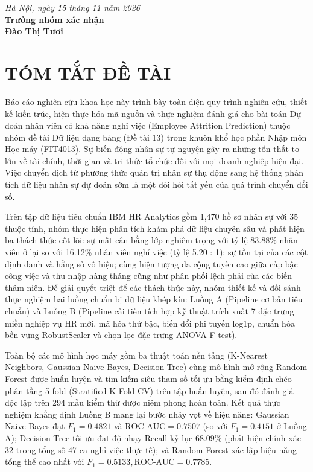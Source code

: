 \documentclass[12pt,a4paper]{article}
\begin{document}
\vspace{0.8cm}
\begin{flushright}
\textit{Hà Nội, ngày 15 tháng 11 năm 2026}\\[0.2cm]
\textbf{Trưởng nhóm xác nhận}\\[1.5cm]
\textbf{Đào Thị Tươi}
\end{flushright}

\newpage
\section*{TÓM TẮT ĐỀ TÀI}

Báo cáo nghiên cứu khoa học này trình bày toàn diện quy trình nghiên cứu, thiết kế kiến trúc, hiện thực hóa mã nguồn và thực nghiệm đánh giá cho bài toán Dự đoán nhân viên có khả năng nghỉ việc (Employee Attrition Prediction) thuộc nhóm đề tài Dữ liệu dạng bảng (Đề tài 13) trong khuôn khổ học phần Nhập môn Học máy (FIT4013). Sự biến động nhân sự tự nguyện gây ra những tổn thất to lớn về tài chính, thời gian và tri thức tổ chức đối với mọi doanh nghiệp hiện đại. Việc chuyển dịch từ phương thức quản trị nhân sự thụ động sang hệ thống phân tích dữ liệu nhân sự dự đoán sớm là một đòi hỏi tất yếu của quá trình chuyển đổi số.

Trên tập dữ liệu tiêu chuẩn IBM HR Analytics gồm 1,470 hồ sơ nhân sự với 35 thuộc tính, nhóm thực hiện phân tích khám phá dữ liệu chuyên sâu và phát hiện ba thách thức cốt lõi: sự mất cân bằng lớp nghiêm trọng với tỷ lệ 83.88\% nhân viên ở lại so với 16.12\% nhân viên nghỉ việc (tỷ lệ 5.20 : 1); sự tồn tại của các cột định danh và hằng số vô hiệu; cùng hiện tượng đa cộng tuyến cao giữa cấp bậc công việc và thu nhập hàng tháng cũng như phân phối lệch phải của các biến thâm niên. Để giải quyết triệt để các thách thức này, nhóm thiết kế và đối sánh thực nghiệm hai luồng chuẩn bị dữ liệu khép kín: Luồng A (Pipeline cơ bản tiêu chuẩn) và Luồng B (Pipeline cải tiến tích hợp kỹ thuật trích xuất 7 đặc trưng miền nghiệp vụ HR mới, mã hóa thứ bậc, biến đổi phi tuyến log1p, chuẩn hóa bền vững RobustScaler và chọn lọc đặc trưng ANOVA F-test).

Toàn bộ các mô hình học máy gồm ba thuật toán nền tảng (K-Nearest Neighbors, Gaussian Naive Bayes, Decision Tree) cùng mô hình mở rộng Random Forest được huấn luyện và tìm kiếm siêu tham số tối ưu bằng kiểm định chéo phân tầng 5-fold (Stratified K-Fold CV) trên tập huấn luyện, sau đó đánh giá độc lập trên 294 mẫu kiểm thử được niêm phong hoàn toàn. Kết quả thực nghiệm khẳng định Luồng B mang lại bước nhảy vọt về hiệu năng: Gaussian Naive Bayes đạt $F_1 = 0.4821$ và $\text{ROC-AUC} = 0.7507$ (so với $F_1 = 0.4151$ ở Luồng A); Decision Tree tối ưu đạt độ nhạy Recall kỷ lục $68.09\%$ (phát hiện chính xác 32 trong tổng số 47 ca nghỉ việc thực tế); và Random Forest xác lập hiệu năng tổng thể cao nhất với $F_1 = 0.5133, \text{ROC-AUC} = 0.7785$.
\end{document}

